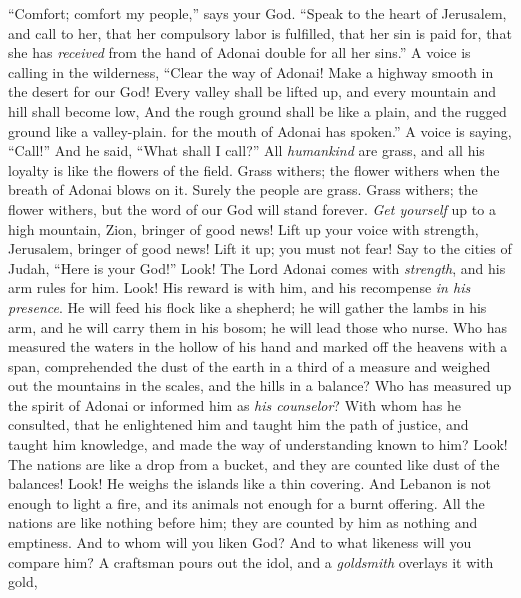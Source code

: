 \begin{biblechapter} %
 “Comfort; comfort my people,” says your God.
\verse “Speak to the heart of Jerusalem, and call to her,
\verse that her compulsory labor is fulfilled, that her sin is paid for, 
that she has \textit{received} from the hand of Adonai double for all her sins.”
\verse A voice is calling in the wilderness, “Clear the way of Adonai! 
Make a highway smooth in the desert for our God!
\verse Every valley shall be lifted up, 
and every mountain and hill shall become low, 
And the rough ground shall be like a plain, 
and the rugged ground like a valley-plain. for the mouth of Adonai has spoken.”
\verse A voice is saying, “Call!” 
And he said, “What shall I call?” 
All \textit{humankind} are grass, 
and all his loyalty is like the flowers of the field.
\verse Grass withers; the flower withers 
when the breath of Adonai blows on it. 
Surely the people are grass.
\verse Grass withers; the flower withers, 
but the word of our God will stand forever.
\verse \textit{Get yourself} up to a high mountain, Zion, bringer of good news! 
Lift up your voice with strength, Jerusalem, bringer of good news! 
Lift it up; you must not fear! 
Say to the cities of Judah, “Here is your God!”
\verse Look! The Lord Adonai comes with \textit{strength}, 
and his arm rules for him. 
Look! His reward is with him, 
and his recompense \textit{in his presence}.
\verse He will feed his flock like a shepherd; 
he will gather the lambs in his arm, 
and he will carry them in his bosom; 
he will lead those who nurse.
\verse Who has measured the waters in the hollow of his hand 
and marked off the heavens with a span, 
comprehended the dust of the earth in a third of a measure 
and weighed out the mountains in the scales, and the hills in a balance?
\verse Who has measured up the spirit of Adonai 
or informed him as \textit{his counselor}?
\verse With whom has he consulted, that he enlightened him 
and taught him the path of justice, 
and taught him knowledge, 
and made the way of understanding known to him?
\verse Look! The nations are like a drop from a bucket, 
and they are counted like dust of the balances! 
Look! He weighs the islands like a thin covering.
\verse And Lebanon is not enough to light a fire, 
and its animals not enough for a burnt offering.
\verse All the nations are like nothing before him; 
they are counted by him as nothing and emptiness.
\verse And to whom will you liken God? 
And to what likeness will you compare him?
\verse A craftsman pours out the idol, 
and a \textit{goldsmith} overlays it with gold, 

\end{biblechapter}
